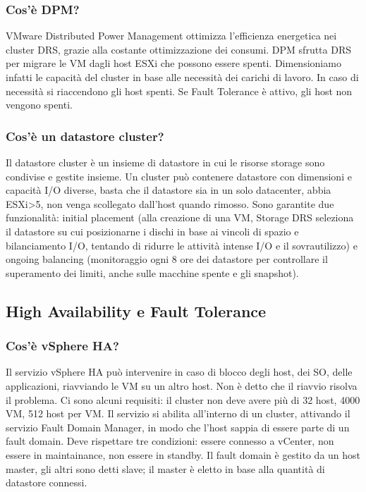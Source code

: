 \documentclass[11pt]{article}
\begin{document}
\subsubsection{Cos'è DPM?}
VMware Distributed Power Management ottimizza l'efficienza energetica nei cluster DRS, grazie alla costante ottimizzazione dei consumi. DPM sfrutta DRS per migrare le VM dagli host ESXi che possono essere spenti. Dimensioniamo infatti le capacità del cluster in base alle necessità dei carichi di lavoro. In caso di necessità si riaccendono gli host spenti. Se Fault Tolerance è attivo, gli host non vengono spenti. 

\subsubsection{Cos'è un datastore cluster?}
Il datastore cluster è un insieme di datastore in cui le risorse storage sono condivise e gestite insieme. Un cluster può contenere datastore con dimensioni e capacità I/O diverse, basta che il datastore sia in un solo datacenter, abbia ESXi>5, non venga scollegato dall'host quando rimosso. Sono garantite due funzionalità: initial placement (alla creazione di una VM, Storage DRS seleziona il datastore su cui posizionarne i dischi in base ai vincoli di spazio e bilanciamento I/O, tentando di ridurre le attività intense I/O e il sovrautilizzo) e ongoing balancing (monitoraggio ogni 8 ore dei datastore per controllare il superamento dei limiti, anche sulle macchine spente e gli snapshot). 

\subsection{High Availability e Fault Tolerance}
\subsubsection{Cos'è vSphere HA?}
Il servizio vSphere HA può intervenire in caso di blocco degli host, dei SO, delle applicazioni, riavviando le VM su un altro host. Non è detto che il riavvio risolva il problema. Ci sono alcuni requisiti: il cluster non deve avere più di 32 host, 4000 VM, 512 host per VM. Il servizio si abilita all'interno di un cluster, attivando il servizio Fault Domain Manager, in modo che l'host sappia di essere parte di un fault domain. Deve rispettare tre condizioni: essere connesso a vCenter, non essere in maintainance, non essere in standby. Il fault domain è gestito da un host master, gli altri sono detti slave; il master è eletto in base alla quantità di datastore connessi. 
\end{document}
